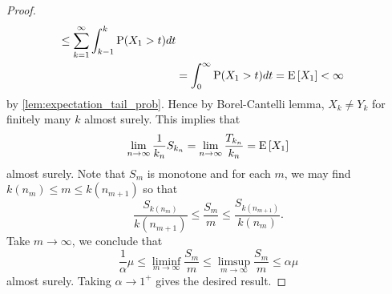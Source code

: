 \begin{proof}
\begin{equation*}
\begin{split}
            \leq \sum_{k=1}^\infty \int_{k-1}^k\operatorname{P}(X_1>t)dt \\
            &= \int_0^\infty \operatorname{P}(X_1>t)dt = \operatorname{E}\left[ {X_1} \right]<\infty
        \end{split}
    \end{equation*}
    by \cref{lem:expectation_tail_prob}. Hence by Borel-Cantelli 
    lemma, $X_k \neq Y_k$ for finitely many $k$ almost surely. 
    This implies that 
    \begin{equation*}
        \lim_{n\to\infty}\frac{1}{k_n}S_{k_n} = \lim_{n\to\infty}\frac{T_{k_n}}{k_n} = \operatorname{E}\left[ {X_1} \right]
    \end{equation*}
    almost surely. Note that $S_m$ is monotone and for each $m$, 
    we may find $k(n_m)\leq m\leq k(n_{m+1})$ so that 
    \begin{equation*}
        \frac{S_{k(n_m)}}{k(n_{m+1})}\leq \frac{S_m}{m} 
        \leq \frac{S_{k(n_{m+1})}}{k(n_m)}.
    \end{equation*} 
    Take $m\to\infty$, we conclude that 
    \begin{equation*}
        \frac{1}{\alpha}\mu \leq \liminf_{m\to\infty}\frac{S_m}{m} 
        \leq \limsup_{m\to\infty}\frac{S_m}{m}\leq \alpha\mu
    \end{equation*}
    almost surely. Taking $\alpha\to 1^+$ gives the desired result. 
\end{proof}

